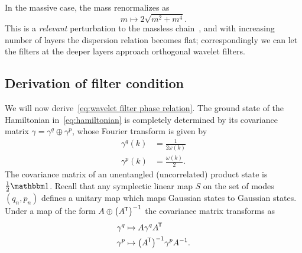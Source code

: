 \documentclass[submission, Phys]{SciPost}
\theoremstyle{definition}
\theoremstyle{remark}
\newcommand{\op}{\oplus}
\newcommand{\id}{\mathbbm 1}
\newcommand*{\tran}{{\mkern-1.5mu\mathsf{T}}}
\begin{document}
In the massive case, the mass renormalizes as
\begin{equation}\label{eq:mass renormalization}
  m \mapsto 2\sqrt{m^2 + m^4}.
\end{equation}
This is a \emph{relevant} perturbation to the massless chain~\cite{evenbly2010entanglement}, and with increasing number of layers the dispersion relation becomes flat; correspondingly we can let the filters at the deeper layers approach orthogonal wavelet filters.

\subsection{Derivation of filter condition}\label{sec:derivation filter condition}
We will now derive~\cref{eq:wavelet filter phase relation}.
The ground state of the Hamiltonian in~\cref{eq:hamiltonian} is completely determined by its covariance matrix $\gamma = \gamma^q \op \gamma^p$, whose Fourier transform is given by
\begin{equation}\begin{aligned}\label{eq:covariance fourier}
  \gamma^q(k) &= \frac{1}{2\omega(k)} \\
  \gamma^p(k) &= \frac{\omega(k)}2.
\end{aligned}\end{equation}
The covariance matrix of an unentangled (uncorrelated) product state is $\frac12 \id$.
Recall that any symplectic linear map $S$ on the set of modes $(q_n, p_n)$ defines a unitary map which maps Gaussian states to Gaussian states.
Under a map of the form $A \op \bigl(A^{\tran}\bigr)^{-1}$ the covariance matrix transforms as
\begin{equation*}\begin{aligned}
  \gamma^q &\mapsto A\gamma^q A^{\tran} \\
  \gamma^p &\mapsto \bigl(A^{\tran}\bigr)^{-1}\gamma^p A^{-1}.
\end{aligned}\end{equation*}
\end{document}
